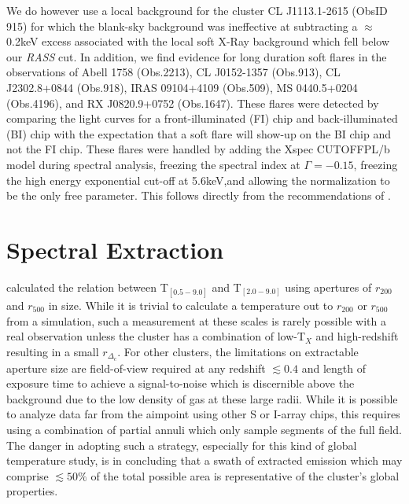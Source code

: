 \documentclass[12pt, preprint]{aastex}
\begin{document}
We do however use a local background for the cluster CL J1113.1-2615
(ObsID 915) for which the blank-sky background was ineffective
at subtracting a $\approx$0.2keV excess associated with the local soft
X-Ray background which fell below our {\textit{RASS}} cut. In
addition, we find evidence for long duration soft flares in the
observations of Abell 1758 (Obs.2213), CL J0152-1357 (Obs.913), CL
J2302.8+0844 (Obs.918), IRAS 09104+4109 (Obs.509), MS 0440.5+0204
(Obs.4196), and RX J0820.9+0752 (Obs.1647). These flares were detected
by comparing the light curves for a front-illuminated (FI) chip and
back-illuminated (BI) chip with the expectation that a soft flare will
show-up on the BI chip and not the FI chip. These flares were handled
by adding the Xspec CUTOFFPL/b model during spectral analysis, freezing
the spectral index at $\Gamma=-0.15$, freezing the high energy
exponential cut-off at 5.6keV,and allowing the normalization to be the
only free parameter. This follows directly from the recommendations of
\cite{2003ApJ...583...70M}.

\section{Spectral Extraction} \label{sec:extraction}

\cite{2001ApJ...546..100M} calculated the relation between
T$_{[0.5-9.0]}$ and T$_{[2.0-9.0]}$ using apertures of $r_{200}$ and
$r_{500}$ in size. While it is trivial to calculate a temperature out
to $r_{200}$ or $r_{500}$ from a simulation, such a measurement at
these scales is rarely possible with a real observation unless the
cluster has a combination of low-T$_X$ and high-redshift resulting in a
small $r_{\Delta_c}$. For other clusters, the limitations on extractable
aperture size are field-of-view required at any redshift $\lesssim 0.4$
and length of exposure time to achieve a signal-to-noise which is
discernible above the background due to the low density of gas at
these large radii. While it is possible to analyze data far from the
aimpoint using other S or I-array chips, this requires using a
combination of partial annuli which only sample segments of the full
field. The danger in adopting such a strategy, especially for this
kind of global temperature study, is in concluding that a swath of
extracted emission which may comprise $\lesssim 50\%$ of the total
possible area is representative of the cluster's global properties.
\end{document}
